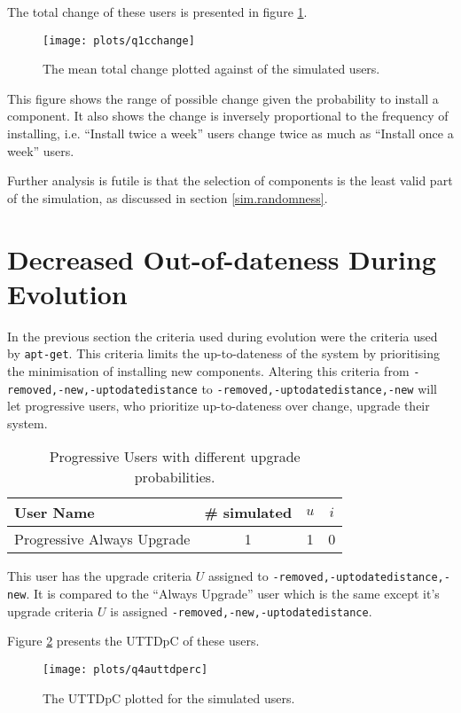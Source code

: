 The total change of these users is presented in figure \ref{exp.q1cchange}.
\begin{figure}[htp]
\begin{center}
  \texttt{[image: plots/q1cchange]}
  \caption{The mean total change plotted against of the simulated users.}
  \label{exp.q1cchange}
\end{center}
\end{figure}
This figure shows the range of possible change given the probability to install a component.
It also shows the change is inversely proportional to the frequency of installing, 
i.e. ``Install twice a week'' users change twice as much as ``Install once a week'' users.

Further analysis is futile is that the selection of components is the least valid part of the simulation, as discussed in section \ref{sim.randomness}.
 

\section{Decreased Out-of-dateness During Evolution}
\label{exp.prouttdsection}
In the previous section the criteria used during evolution were the criteria used by \texttt{apt-get}.
This criteria limits the up-to-dateness of the system by prioritising the minimisation of installing new components.
Altering this criteria from \texttt{-removed,-new,-uptodatedistance} to \texttt{-removed,-uptodatedistance,-new} 
will let progressive users, who prioritize up-to-dateness over change, upgrade their system.

\begin{table}[h!]
\centering
\begin{tabular}{|l | c | c | c |}
\hline
User Name 								& \# simulated 			& $u$ 		& $i$ 			\\ \hline
Progressive Always Upgrade				& 1 			 	& 1				& 0\\ \hline
\end{tabular}
\caption{Progressive Users with different upgrade probabilities.}
\label{exp.tblextremeusers}
\end{table}
This user has the upgrade criteria $U$ assigned to \texttt{-removed,-uptodatedistance,-new}.
It is compared to the ``Always Upgrade'' user which is the same except it's upgrade criteria $U$ is assigned \texttt{-removed,-new,-uptodatedistance}.

Figure \ref{exp.q4auttdperc} presents the UTTDpC of these users.
\begin{figure}[htp]
\begin{center}
  \texttt{[image: plots/q4auttdperc]}
  \caption{The UTTDpC plotted for the simulated users.}
  \label{exp.q4auttdperc}
\end{center}
\end{figure}

